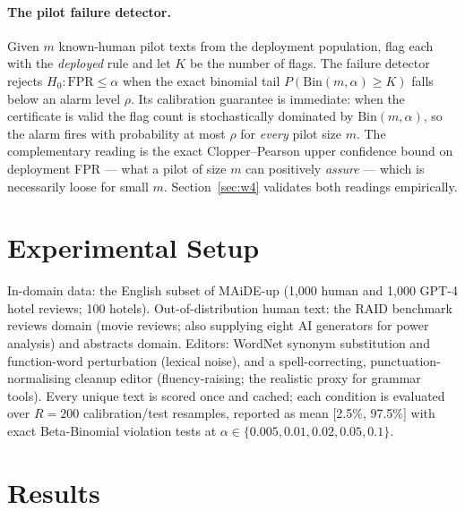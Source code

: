 \documentclass[11pt]{article}
\begin{document}
\paragraph{The pilot failure detector.}
Given $m$ known-human pilot texts from the deployment population, flag each with the \emph{deployed} rule and let $K$ be the number of flags. The failure detector rejects $H_0\!:\mathrm{FPR}\le\alpha$ when the exact binomial tail $P(\mathrm{Bin}(m,\alpha)\ge K)$ falls below an alarm level $\rho$. Its calibration guarantee is immediate: when the certificate is valid the flag count is stochastically dominated by $\mathrm{Bin}(m,\alpha)$, so the alarm fires with probability at most $\rho$ for \emph{every} pilot size $m$. The complementary reading is the exact Clopper--Pearson upper confidence bound on deployment FPR --- what a pilot of size $m$ can positively \emph{assure} --- which is necessarily loose for small $m$. Section~\ref{sec:w4} validates both readings empirically.
\section{Experimental Setup}
In-domain data: the English subset of MAiDE-up \cite{maideup} (1{,}000 human and 1{,}000 GPT-4 hotel reviews; 100 hotels). Out-of-distribution human text: the RAID benchmark \cite{raid} reviews domain (movie reviews; also supplying eight AI generators for power analysis) and abstracts domain. Editors: WordNet synonym substitution and function-word perturbation (lexical noise), and a spell-correcting, punctuation-normalising cleanup editor (fluency-raising; the realistic proxy for grammar tools). Every unique text is scored once and cached; each condition is evaluated over $R=200$ calibration/test resamples, reported as mean [2.5\%, 97.5\%] with exact Beta-Binomial violation tests at $\alpha\in\{0.005, 0.01, 0.02, 0.05, 0.1\}$.
\section{Results}
\end{document}
